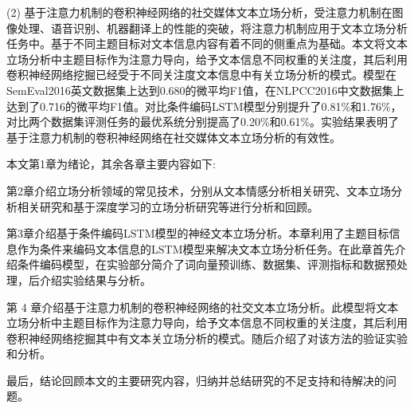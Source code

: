 (2) 基于注意力机制的卷积神经网络的社交媒体文本立场分析，受注意力机制在图像处理、语音识别、机器翻译上的性能的突破，将注意力机制应用于文本立场分析任务中。基于不同主题目标对文本信息内容有着不同的侧重点为基础。本文将文本立场分析中主题目标作为注意力导向，给予文本信息不同权重的关注度，其后利用卷积神经网络挖掘已经受于不同关注度文本信息中有关立场分析的模式。模型在SemEval2016英文数据集上达到0.680的微平均F1值，在NLPCC2016中文数据集上达到了0.716的微平均F1值。对比条件编码LSTM模型分别提升了0.81\%和1.76\%，对比两个数据集评测任务的最优系统分别提高了0.20\%和0.61\%。实验结果表明了基于注意力机制的卷积神经网络在社交媒体文本立场分析的有效性。

本文第1章为绪论，其余各章主要内容如下:

第2章介绍立场分析领域的常见技术，分别从文本情感分析相关研究、文本立场分析相关研究和基于深度学习的立场分析研究等进行分析和回顾。

第3章介绍基于条件编码LSTM模型的神经文本立场分析。本章利用了主题目标信息作为条件来编码文本信息的LSTM模型来解决文本立场分析任务。在此章首先介绍条件编码模型，在实验部分简介了词向量预训练、数据集、评测指标和数据预处理，后介绍实验结果与分析。

第 4 章介绍基于注意力机制的卷积神经网络的社交文本立场分析。此模型将文本立场分析中主题目标作为注意力导向，给予文本信息不同权重的关注度，其后利用卷积神经网络挖掘其中有文本关立场分析的模式。随后介绍了对该方法的验证实验和分析。

最后，结论回顾本文的主要研究内容，归纳并总结研究的不足支持和待解决的问题。


